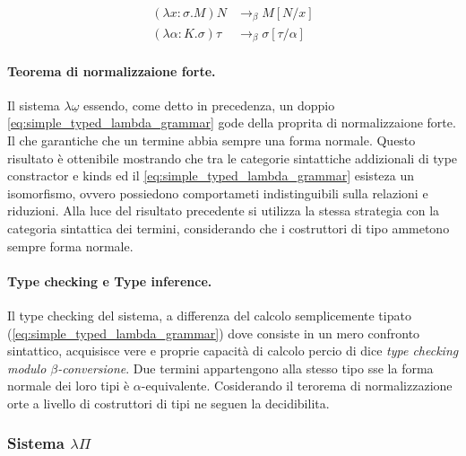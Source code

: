 \begin{align}
    (\lambda x : \sigma. M) N & \to_\beta M[N/x] 
    \tag{Term-level $\beta$} 
    \label{eq:term_beta_reduction} \\
    (\lambda \alpha : K. \sigma) \tau & \to_\beta \sigma[\tau/\alpha] 
    \tag{Type-level $\beta$}
    \label{eq:type_system_omega_under_beta_reduction} 
\end{align}

\paragraph{Teorema di normalizzaione forte.}
Il sistema $\lambda\underline{\omega}$ essendo, come detto in precedenza, un doppio \ref{eq:simple_typed_lambda_grammar} gode della proprita di normalizzaione forte.
Il che garantiche che un termine abbia sempre una forma normale. Questo risultato è ottenibile mostrando che tra le categorie sintattiche addizionali di type constractor
e kinds ed il \ref{eq:simple_typed_lambda_grammar} esisteza un isomorfismo, ovvero possiedono comportameti indistinguibili sulla relazioni e riduzioni. Alla luce del 
risultato precedente si utilizza la stessa strategia con la categoria sintattica dei termini, considerando che i costruttori di tipo ammetono sempre forma normale.

\paragraph{Type checking e Type inference.}
Il type checking del sistema, a differenza del calcolo semplicemente tipato (\ref{eq:simple_typed_lambda_grammar}) dove consiste in un mero confronto sintattico, acquisisce vere e proprie 
capacità di calcolo percio di dice \emph{type checking modulo $\beta$-conversione}. Due termini appartengono alla stesso tipo sse la forma normale dei loro tipi è $\alpha$-equivalente. 
Cosiderando il terorema di normalizzazione orte a livello di costruttori di tipi ne seguen la decidibilita.

\subsubsection{Sistema \texorpdfstring{$\lambda$}{Lambda}\texorpdfstring{$\Pi$}{Pi}}

